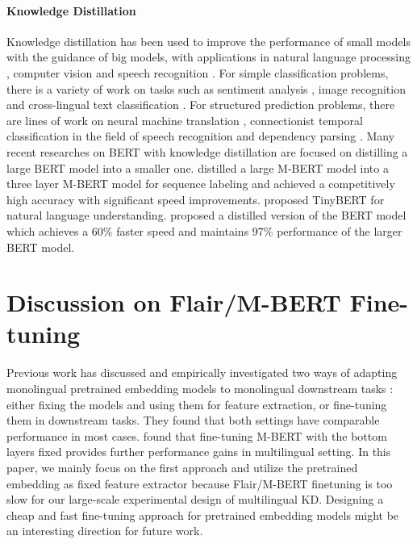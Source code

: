 \documentclass[11pt,a4paper]{article}
\begin{document}
\paragraph{Knowledge Distillation}
Knowledge distillation has been used to improve the performance of small models with the guidance of big models, with applications in natural language processing \cite{kim-rush-2016-sequence,kuncoro-etal-2016-distilling,tan2018multilingual,clark-etal-2019-bam,sun2019patient}, computer vision \cite{NIPS2014_5484} and speech recognition \cite{Huang2018}. For simple classification problems, there is a variety of work on tasks such as sentiment analysis \cite{clark-etal-2019-bam}, image recognition \cite{44873} and cross-lingual text classification \cite{xu-yang-2017-cross}.
For structured prediction problems, there are lines of work on neural machine translation  \cite{kim-rush-2016-sequence,tan2018multilingual}, connectionist temporal classification in the field of speech recognition \cite{Huang2018} and dependency parsing \cite{kuncoro-etal-2016-distilling,liu2018distilling}. Many recent researches on BERT with knowledge distillation are focused on distilling a large BERT model into a smaller one. \cite{tsai-etal-2019-small} distilled a large M-BERT model into a three layer M-BERT model for sequence labeling and achieved a competitively high accuracy with significant speed improvements. \cite{jiao2019tinybert} proposed TinyBERT for natural language understanding. \cite{sanh2019distilbert} proposed a distilled version of the BERT model which achieves a 60\% faster speed and maintains 97\% performance of the larger BERT model.





\section{Discussion on Flair/M-BERT Fine-tuning}
Previous work has discussed and empirically investigated two ways of adapting monolingual pretrained embedding models to monolingual downstream tasks \cite{peters-etal-2019-tune}: either fixing the models and using them for feature extraction, or fine-tuning them in downstream tasks. They found that both settings have comparable performance in most cases. \citet{wu-dredze-2019-beto} found that fine-tuning M-BERT with the bottom layers fixed provides further performance gains in multilingual setting. In this paper, we mainly focus on the first approach and utilize the pretrained embedding as fixed feature extractor because Flair/M-BERT finetuning is too slow for our large-scale experimental design of multilingual KD. Designing a cheap and fast fine-tuning approach for pretrained embedding models might be an interesting direction for future work. 
\end{document}
